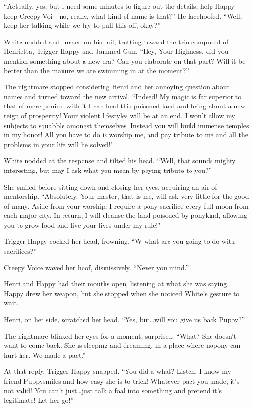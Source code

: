 ``Actually, yes, but I need some minutes to figure out the details, help Happy keep Creepy Voi---no, really, what kind of name is that?'' He facehoofed. ``Well, keep her talking while we try to pull this off, okay?''

White nodded and turned on his tail, trotting toward the trio composed of Henrietta, Trigger Happy and Jammed Gun. ``Hey, Your Highness, did you mention something about a new era? Can you elaborate on that part? Will it be better than the manure we are swimming in at the moment?''

The nightmare stopped considering Henri and her annoying question about names and turned toward the new arrival. ``Indeed! My magic is far superior to that of mere ponies, with it I can heal this poisoned land and bring about a new reign of prosperity! Your violent lifestyles will be at an end. I won't allow my subjects to squabble amongst themselves. Instead you will build immense temples in my honor! All you have to do is worship me, and pay tribute to me and all the problems in your life will be solved!"

White nodded at the response and tilted his head. ``Well, that sounds mighty interesting, but may I ask what you mean by paying tribute to you?''

She smiled before sitting down and closing her eyes, acquiring an air of mentorship. ``Absolutely. Your master, that is me, will ask very little for the good of many. Aside from your worship, I require a pony sacrifice every full moon from each major city. In return, I will cleanse the land poisoned by ponykind, allowing you to grow food and live your lives under my rule!"

Trigger Happy cocked her head, frowning. ``W-what are you going to do with sacrifices?''

Creepy Voice waved her hoof, dismissively. ``Never you mind.''

Henri and Happy had their mouths open, listening at what she was saying. Happy drew her weapon, but she stopped when she noticed White's gesture to wait.

Henri, on her side, scratched her head. ``Yes, but\dots will you give us back Puppy?''

The nightmare blinked her eyes for a moment, surprised. ``What? She doesn't want to come back. She is sleeping and dreaming, in a place where nopony can hurt her. We made a pact.''

At that reply, Trigger Happy snapped. ``You did a what? Listen, I know my friend Puppysmiles and how easy she is to trick! Whatever pact you made, it's not valid! You can't just\dots just talk a foal into something and pretend it's legitimate! Let her go!''

